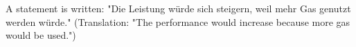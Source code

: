 A statement is written:  
"Die Leistung würde sich steigern, weil mehr Gas genutzt werden würde."  
(Translation: "The performance would increase because more gas would be used.")
